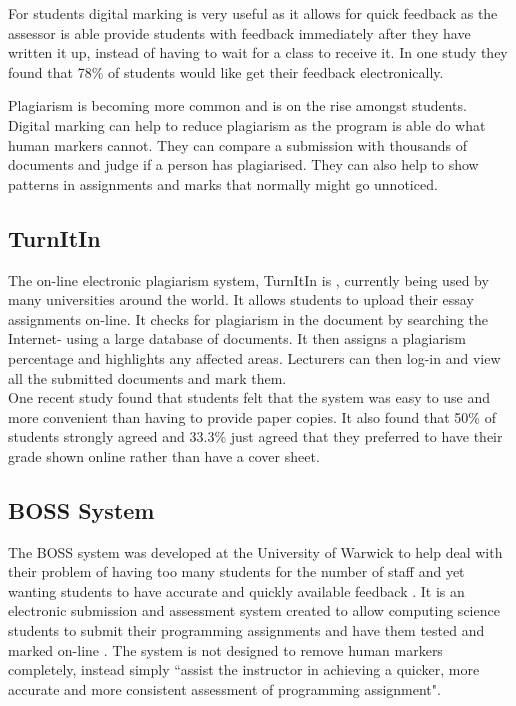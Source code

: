 \documentclass[11pt]{report}
\begin{document}
For students digital marking is very useful as it allows for quick feedback as the assessor is able provide students with feedback immediately after they have written it up, instead of having to wait for a class to receive it. In one study \cite{dahl_turnitin_2007-1} they found that 78\% of students would like get their feedback  electronically. 

Plagiarism is becoming more common \cite{derby_duplication_2008-1} and is on the rise amongst students. Digital marking can help to reduce plagiarism as the program is able do what human markers cannot. They can compare a submission with thousands of documents and judge if a person has plagiarised. They can also help to show patterns in assignments and marks that normally might go unnoticed.

\subsection{TurnItIn}
The on-line electronic plagiarism system, TurnItIn is \cite{_turnitin_????-1}, currently being used by many universities around the world. It allows students to upload their essay assignments on-line. It checks for plagiarism in the document by searching the Internet- using a large database of documents. It then assigns a plagiarism percentage and highlights any affected areas. Lecturers can then log-in and view all the submitted documents and mark them.\\
One recent study \cite{dahl_turnitin_2007-1} found that students felt that the system was easy to use and more convenient than having to provide paper copies. It also found that 50\% of students strongly agreed and 33.3\% just agreed that they preferred to have their grade shown online rather than have a cover sheet.

\subsection{BOSS System}
The BOSS system  was developed at the University of Warwick to help deal with their problem of having too many students for the number of staff and yet wanting students to have accurate and quickly available feedback \cite{joy_boss_2005-5}.
It is an electronic submission and assessment system created to allow computing science students to submit their programming assignments and have them tested and marked on-line \cite{joy_effective_1998-1}. The system is not designed to remove human markers completely, instead simply ``assist the instructor in achieving a quicker, more accurate and more consistent assessment of programming assignment"\cite{joy_boss_2005-5}.
\end{document}
